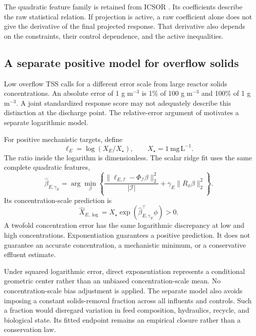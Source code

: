 The quadratic feature family is retained from ICSOR \citep{Selerio2026}. Its coefficients describe the raw statistical relation. If projection is active, a raw coefficient alone does not give the derivative of the final projected response. That derivative also depends on the constraints, their control dependence, and the active inequalities.

\subsection{A separate positive model for overflow solids}

Low overflow TSS calls for a different error scale from large reactor solids concentrations. An absolute error of 1 g m$^{-3}$ is 1\% of 100 g m$^{-3}$ and 100\% of 1 g m$^{-3}$. A joint standardized response score may not adequately describe this distinction at the discharge point. The relative-error argument of \citet{Tofallis2015} motivates a separate logarithmic model.

For positive mechanistic targets, define
\begin{equation}
\ell_E=\log(X_E/X_\star),\qquad X_\star=1\ \mathrm{mg\,L^{-1}}.
\label{eq:plant_log_target}
\end{equation}
The ratio inside the logarithm is dimensionless. The scalar ridge fit uses the same complete quadratic features,
\begin{equation}
\widehat\beta_{E,\gamma_E}=\arg\min_\beta
\left\{\frac{\|\ell_{E,\mathcal I}-\Phi_{\mathcal I}\beta\|_2^2}{|\mathcal I|}
+\gamma_E\|R_\phi\beta\|_2^2\right\}.
\end{equation}
Its concentration-scale prediction is
\begin{equation}
\widehat X_{E,\log}=X_\star\exp\left(\widehat\beta_{E,\gamma_E}^\top\phi\right)>0.
\label{eq:plant_log_prediction}
\end{equation}
A twofold concentration error has the same logarithmic discrepancy at low and high concentrations. Exponentiation guarantees a positive prediction. It does not guarantee an accurate concentration, a mechanistic minimum, or a conservative effluent estimate.

Under squared logarithmic error, direct exponentiation represents a conditional geometric center rather than an unbiased concentration-scale mean. No concentration-scale bias adjustment is applied. The separate model also avoids imposing a constant solids-removal fraction across all influents and controls. Such a fraction would disregard variation in feed composition, hydraulics, recycle, and biological state. Its fitted endpoint remains an empirical closure rather than a conservation law.

